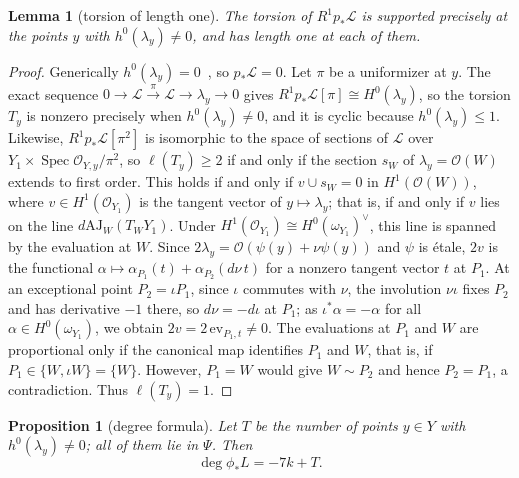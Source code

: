\documentclass[11pt]{article}
\newtheorem{proposition}[theorem]{Proposition}
\newtheorem{lemma}[theorem]{Lemma}
\theoremstyle{definition}
\theoremstyle{remark}
\newcommand{\OO}{\mathcal{O}}
\newcommand{\cL}{\mathcal{L}}
\begin{document}
\begin{lemma}[torsion of length one]\label{lem:length}
The torsion of $R^1p_*\cL$ is supported precisely at the points $y$ with
$h^0(\lambda_y)\ne 0$, and has length one at each of them.
\end{lemma}

\begin{proof}
Generically $h^0(\lambda_y)=0$~\cite[Prop.~5\,ii)]{So26}, so $p_*\cL=0$. Let $\pi$
be a uniformizer at $y$. The exact sequence $0\to\cL\xrightarrow{\pi}\cL\to\lambda_y\to
0$ gives $R^1p_*\cL[\pi]\cong H^0(\lambda_y)$, so the torsion $T_y$ is nonzero
precisely when $h^0(\lambda_y)\ne 0$, and it is cyclic because
$h^0(\lambda_y)\le 1$. Likewise, $R^1p_*\cL[\pi^2]$ is isomorphic to the space of
sections of $\cL$ over $Y_1\times\operatorname{Spec}\OO_{Y,y}/\pi^2$, so
$\ell(T_y)\ge 2$ if and only if the section $s_W$ of $\lambda_y=\OO(W)$ extends to
first order. This holds if and only if $v\cup s_W=0$ in $H^1(\OO(W))$, where
$v\in H^1(\OO_{Y_1})$ is the tangent vector of $y\mapsto\lambda_y$; that is, if
and only if $v$ lies on the line $d\mathrm{AJ}_W(T_WY_1)$. Under $H^1(\OO_{Y_1})
\cong H^0(\omega_{Y_1})^\vee$, this line is spanned by the evaluation at $W$.
Since $2\lambda_y=\OO(\psi(y)+\nu\psi(y))$ and $\psi$ is \'etale, $2v$ is the
functional $\alpha\mapsto\alpha_{P_1}(t)+\alpha_{P_2}(d\nu\,t)$ for a nonzero
tangent vector $t$ at $P_1$. At an exceptional point $P_2=\iota P_1$, since
$\iota$ commutes with $\nu$, the involution $\nu\iota$ fixes $P_2$ and has
derivative $-1$ there, so $d\nu=-d\iota$ at $P_1$; as $\iota^*\alpha=-\alpha$ for
all $\alpha\in
H^0(\omega_{Y_1})$, we obtain $2v=2\,\mathrm{ev}_{P_1,t}\ne 0$. The evaluations at
$P_1$ and $W$ are proportional only if the canonical map identifies $P_1$ and $W$,
that is, if $P_1\in\{W,\iota W\}=\{W\}$. However, $P_1=W$ would give $W\sim P_2$
and hence $P_2=P_1$, a contradiction. Thus $\ell(T_y)=1$.
\end{proof}

\begin{proposition}[degree formula]\label{prop:degree}
Let $T$ be the number of points $y\in Y$ with $h^0(\lambda_y)\ne 0$; all of them
lie in $\Psi$. Then
\[
\deg\phi_*L=-7k+T .
\]
\end{proposition}
\end{document}
